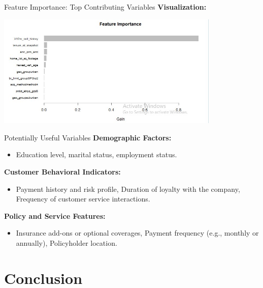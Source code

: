 \documentclass{beamer}\usepackage[]{graphicx}\usepackage[]{xcolor}
\begin{document}
\begin{frame}{Feature Importance: Top Contributing Variables}
\textbf{Visualization:}
\begin{center}
    \includegraphics[width=0.8\textwidth]{Feature.jpg} 
\end{center}

\end{frame}


\begin{frame}{Potentially Useful Variables}
\textbf{Demographic Factors:}
\begin{itemize}
    \item Education level, marital status, employment status.
\end{itemize}

\textbf{Customer Behavioral Indicators:}
\begin{itemize}
    \item Payment history and risk profile, Duration of loyalty with the company, Frequency of customer service interactions.
\end{itemize}

\textbf{Policy and Service Features:}
\begin{itemize}
    \item Insurance add-ons or optional coverages, Payment frequency (e.g., monthly or annually), Policyholder location.
\end{itemize}

\end{frame}


\section{Conclusion}
\end{document}
